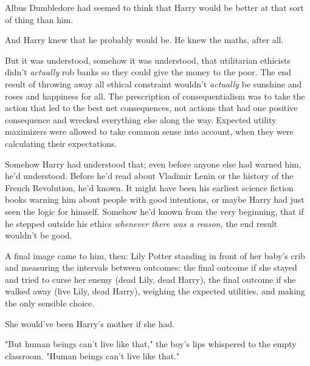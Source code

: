 Albus Dumbledore had seemed to think that Harry would be better at that sort of
thing than him.

And Harry knew that he probably would be. He knew the maths, after all.

But it was understood, somehow it was understood, that utilitarian ethicists
didn't \emph{actually} rob banks so they could give the money to the poor. The
end result of throwing away all ethical constraint wouldn't \emph{actually} be
sunshine and roses and happiness for all. The prescription of consequentialism
was to take the action that led to the best net consequences, not actions that
had one positive consequence and wrecked everything else along the way.
Expected utility maximizers were allowed to take common sense into account,
when they were calculating their expectations.

Somehow Harry had understood that; even before anyone else had warned him, he'd
understood. Before he'd read about Vladimir Lenin or the history of the French
Revolution, he'd known. It might have been his earliest science fiction books
warning him about people with good intentions, or maybe Harry had just seen the
logic for himself. Somehow he'd known from the very beginning, that if he
stepped outside his ethics \emph{whenever there was a reason,} the end result
wouldn't be good.

A final image came to him, then: Lily Potter standing in front of her baby's
crib and measuring the intervals between outcomes: the final outcome if she
stayed and tried to curse her enemy (dead Lily, dead Harry), the final outcome
if she walked away (live Lily, dead Harry), weighing the expected utilities,
and making the only sensible choice.

She would've been Harry's mother if she had.

"But human beings can't live like that," the boy's lips whispered to the empty
classroom. "Human beings can't live like that."
